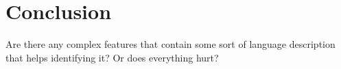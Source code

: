 \chapter{Conclusion}

Are there any complex features that contain some sort of language description that helps identifying it? Or does everything hurt?\\
